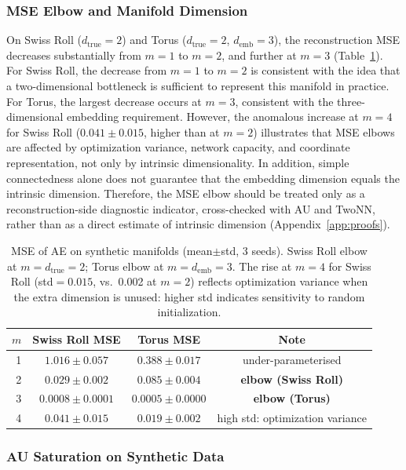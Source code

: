 \documentclass[make,article,submit,pdftex,moreauthors]{Definitions/mdpi}
\begin{document}
\subsubsection{MSE Elbow and Manifold Dimension}

On Swiss Roll ($d_{\mathrm{true}}=2$) and Torus ($d_{\mathrm{true}}=2$,
$d_{\mathrm{emb}}=3$), the reconstruction MSE decreases substantially from
$m=1$ to $m=2$, and further at $m=3$ (Table~\ref{tab:e1}).
For Swiss Roll, the decrease from $m=1$ to $m=2$ is consistent with the idea
that a two-dimensional bottleneck is sufficient to represent this manifold in
practice.
For Torus, the largest decrease occurs at $m=3$, consistent with the
three-dimensional embedding requirement.
However, the anomalous increase at $m=4$ for Swiss Roll ($0.041\pm0.015$,
higher than at $m=2$) illustrates that MSE elbows are affected by
optimization variance, network capacity, and coordinate representation, not
only by intrinsic dimensionality.
In addition, simple connectedness alone does not guarantee that the embedding
dimension equals the intrinsic dimension.
Therefore, the MSE elbow should be treated only as a reconstruction-side
diagnostic indicator, cross-checked with AU and TwoNN, rather than as a
direct estimate of intrinsic dimension (Appendix~\ref{app:proofs}).

\begin{table}[ht]
\centering
\caption{MSE of AE on synthetic manifolds (mean$\pm$std, 3 seeds).
Swiss Roll elbow at $m=d_{\mathrm{true}}=2$; Torus elbow at $m=d_{\mathrm{emb}}=3$.
The rise at $m=4$ for Swiss Roll (std$=0.015$, vs.\ 0.002 at $m=2$) reflects
optimization variance when the extra dimension is unused: higher std indicates
sensitivity to random initialization.}
\label{tab:e1}
\small
\begin{tabular}{rccc}
\toprule
$m$ & Swiss Roll MSE & Torus MSE & Note \\
\midrule
1 & $1.016\pm0.057$ & $0.388\pm0.017$ & under-parameterised \\
2 & $\boldsymbol{0.029\pm0.002}$ & $0.085\pm0.004$ & \textbf{elbow (Swiss Roll)} \\
3 & $0.0008\pm0.0001$ & $\boldsymbol{0.0005\pm0.0000}$ & \textbf{elbow (Torus)} \\
4 & $0.041\pm0.015$ & $0.019\pm0.002$ & high std: optimization variance \\
\bottomrule
\end{tabular}
\end{table}

\subsubsection{AU Saturation on Synthetic Data}
\end{document}
